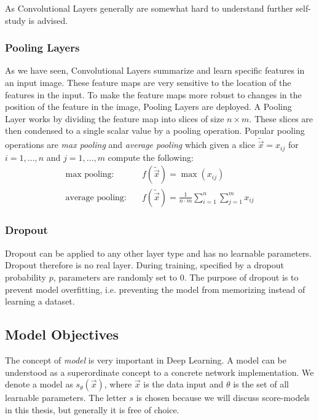 As Convolutional Layers generally are somewhat hard to understand further self-study is advised.
%
\subsubsection{Pooling Layers}
As we have seen, Convolutional Layers summarize and learn specific features in an input image. These feature maps are very sensitive to the location of the features in the input. To make the feature maps more robust to changes in the position of the feature in the image, Pooling Layers are deployed. A Pooling Layer works by dividing the feature map into slices of size $n\times m$. These slices are then condensed to a single scalar value by a pooling operation. Popular pooling operations are \textit{max pooling} and \textit{average pooling} which given a slice $\tilde{\vec{x}}=x_{ij}$ for $i=1,\dots,n$ and $j=1,\dots,m$ compute the following:
%
\begin{align}
    \text{max pooling:}\quad&f(\tilde{\vec{x}})=\max(x_{ij})\\
    \text{average pooling:}\quad&f(\tilde{\vec{x}})=\frac{1}{n\cdot m}\sum_{i=1}^n\sum_{j=1}^mx_{ij}
\end{align}
%
\subsubsection{Dropout }
Dropout can be applied to any other layer type and has no learnable parameters. Dropout therefore is no real layer. During training, specified by a dropout probability $p$, parameters are randomly set to $0$. The purpose of dropout is to prevent model overfitting, i.e. preventing the model from memorizing instead of learning a dataset.
%
\subsection{Model Objectives}
The concept of \textit{model} is very important in Deep Learning. A model can be understood as a superordinate concept to a concrete network implementation. We denote a model as $s_\theta(\vec{x})$, where $\vec{x}$ is the data input and $\theta$ is the set of all learnable parameters. The letter $s$ is chosen because we will discuss score-models in this thesis, but generally it is free of choice.


